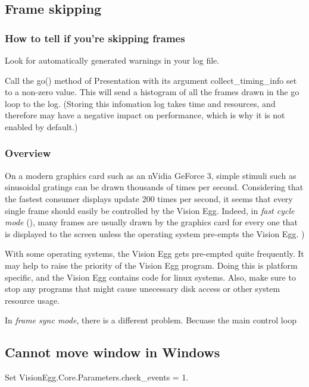 \subsection{Frame skipping}

\subsubsection{How to tell if you're skipping frames}

Look for automatically generated warnings in your log file.

Call the go() method of Presentation with its argument
collect_timing_info set to a non-zero value. This will send a
histogram of all the frames drawn in the go loop to the log.  (Storing
this infomation log takes time and resources, and therefore may have a
negative impact on performance, which is why it is not enabled by
default.)

\subsubsection{Overview}
On a modern graphics card such as an nVidia GeForce 3, simple
stimuli such as sinusoidal gratings can be drawn thousands of times
per second. Considering that the fastest consumer displays update 200
times per second, it seems that every single frame should easily be
controlled by the Vision Egg. Indeed, in \emph{fast cycle mode}
(), many frames are usually drawn by the graphics card for
every one that is displayed to the screen unless the operating
system pre-empts the Vision Egg. )

With some operating systems, the Vision Egg gets pre-empted quite
frequently. It may help to raise the priority of the Vision Egg
program. Doing this is platform specific, and the Vision Egg contains
code for linux systems. Also, make sure to stop any programs that
might cause unecessary disk access or other system resource usage.

In \emph{frame sync mode}, there is a different problem.  Becuase the
main control loop

\subsection{Cannot move window in Windows}

Set VisionEgg.Core.Parameters.check_events = 1.